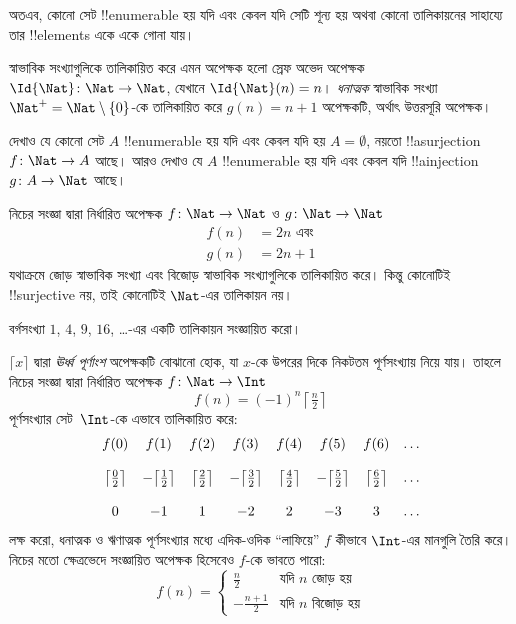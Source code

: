 \documentclass[../../../include/open-logic-section]{subfiles}
\begin{document}
\begin{explain}
অতএব, কোনো সেট !!{enumerable} হয় যদি এবং কেবল যদি সেটি শূন্য হয় অথবা কোনো তালিকায়নের সাহায্যে তার !!{element}s একে একে গোনা যায়।
\end{explain}

\begin{ex}
স্বাভাবিক সংখ্যাগুলিকে তালিকায়িত করে এমন অপেক্ষক হলো স্রেফ অভেদ অপেক্ষক $\Id{\Nat} \colon \Nat \to \Nat$, যেখানে $\Id{\Nat}(n) = n$। \emph{ধনাত্মক} স্বাভাবিক সংখ্যা $\Nat^+ = \Nat \setminus \{0\}$-কে তালিকায়িত করে $g(n) = n + 1$ অপেক্ষকটি, অর্থাৎ উত্তরসূরি অপেক্ষক।
\end{ex}

\begin{prob}
দেখাও যে কোনো সেট $A$ !!{enumerable} হয় যদি এবং কেবল যদি হয় $A = \emptyset$, নয়তো !!a{surjection} $f\colon \Nat \to A$ আছে। আরও দেখাও যে $A$ !!{enumerable} হয় যদি এবং কেবল যদি !!a{injection} $g\colon A \to \Nat$ আছে।
\end{prob}

\begin{ex}
নিচের সংজ্ঞা দ্বারা নির্ধারিত অপেক্ষক $f\colon \Nat \to \Nat$ ও $g \colon \Nat \to \Nat$
\begin{align*}
  f(n) & = 2n \text{ এবং}\\
  g(n) & = 2n+1
\end{align*}
যথাক্রমে জোড় স্বাভাবিক সংখ্যা এবং বিজোড় স্বাভাবিক সংখ্যাগুলিকে তালিকায়িত করে। কিন্তু কোনোটিই !!{surjective} নয়, তাই কোনোটিই $\Nat$-এর তালিকায়ন নয়।
\end{ex}

\begin{prob}
বর্গসংখ্যা $1$, $4$, $9$, $16$, \dots{}-এর একটি তালিকায়ন সংজ্ঞায়িত করো।
\end{prob}

\begin{ex}
$\lceil x \rceil$ দ্বারা \emph{ঊর্ধ্ব পূর্ণাংশ} অপেক্ষকটি বোঝানো হোক, যা $x$-কে উপরের দিকে নিকটতম পূর্ণসংখ্যায় নিয়ে যায়। তাহলে নিচের সংজ্ঞা দ্বারা নির্ধারিত অপেক্ষক $f \colon \Nat \to \Int$
\[
  f(n) = (-1)^{n} \left\lceil\tfrac{n}{2}\right\rceil
\]
পূর্ণসংখ্যার সেট~$\Int$-কে এভাবে তালিকায়িত করে:
\[
\begin{array}{c c c c c c c c}
f(0) & f(1) & f(2) & f(3) & f(4) & f(5) & f(6) & \dots \\ \\
\big\lceil \tfrac{0}{2} \big\rceil & -\big\lceil \tfrac{1}{2}\big\rceil &  \big\lceil \tfrac{2}{2} \big\rceil & -\big\lceil \tfrac{3}{2} \big\rceil & \big\lceil \tfrac{4}{2} \big\rceil  & -\big\lceil \tfrac{5}{2}\big\rceil & \big\lceil \tfrac{6}{2} \big\rceil & \dots \\ \\
0 & -1 & 1 & -2 & 2 & -3 & 3& \dots
\end{array}
\]
লক্ষ করো, ধনাত্মক ও ঋণাত্মক পূর্ণসংখ্যার মধ্যে এদিক-ওদিক ``লাফিয়ে'' $f$ কীভাবে $\Int$-এর মানগুলি তৈরি করে। নিচের মতো ক্ষেত্রভেদে সংজ্ঞায়িত অপেক্ষক হিসেবেও $f$-কে ভাবতে পারো:
\[
f(n) = \begin{cases}
  \frac{n}{2} & \text{যদি $n$ জোড় হয়}\\
  -\frac{n+1}{2} & \text{যদি $n$ বিজোড় হয়}
  \end{cases}
\]
\end{ex}
\end{document}
